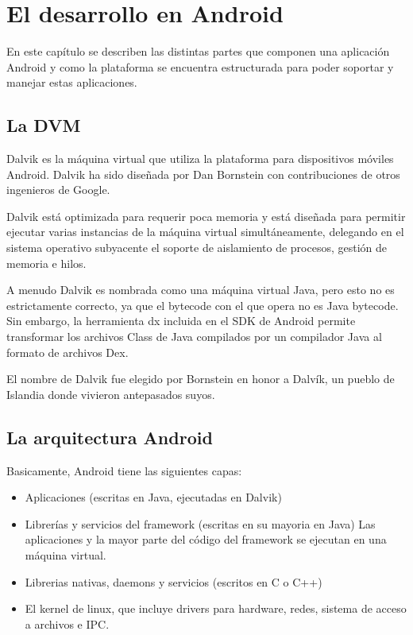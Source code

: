 \chapter{El desarrollo en Android}
\label{cpt:android.dev}

En este cap\'itulo se describen las distintas partes que componen una aplicaci\'on Android y como la plataforma se encuentra estructurada para poder soportar y manejar estas aplicaciones.

\section{La \ac{DVM}}
\label{sec:dvm}

Dalvik es la m\'aquina virtual que utiliza la plataforma para dispositivos m\'oviles Android. Dalvik ha sido diseñada por Dan Bornstein con contribuciones de otros ingenieros de Google.

Dalvik est\'a optimizada para requerir poca memoria y est\'a diseñada para permitir ejecutar varias instancias de la m\'aquina virtual simult\'aneamente, delegando en el sistema operativo subyacente el soporte de aislamiento de procesos, gesti\'on de memoria e hilos.

A menudo Dalvik es nombrada como una m\'aquina virtual Java, pero esto no es estrictamente correcto, ya que el bytecode con el que opera no es Java bytecode. Sin embargo, la herramienta dx incluida en el \ac{SDK} de Android permite transformar los archivos Class de Java compilados por un compilador Java al formato de archivos Dex.

El nombre de Dalvik fue elegido por Bornstein en honor a Dalvík, un pueblo de Islandia donde vivieron antepasados suyos.~\cite{wiki.dvm}

\section{La arquitectura Android}
\label{sec:arq}

Basicamente, Android tiene las siguientes capas:

\begin{itemize}
\item Aplicaciones (escritas en Java, ejecutadas en Dalvik)
\item Librer\'ias y servicios del framework (escritas en su mayoria en Java)
\subitem Las aplicaciones y la mayor parte del c\'odigo del framework se ejecutan en una m\'aquina virtual. 
\item Librerias nativas, daemons y servicios (escritos en C o C++)
\item El kernel de linux, que incluye
\subitem drivers para hardware, redes, sistema de acceso a archivos e \ac{IPC}.
\end{itemize}

